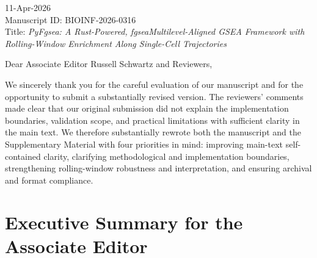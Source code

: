 \documentclass[11pt]{article}
\begin{document}
\begin{flushleft}
11-Apr-2026\\[0.75em]
Manuscript ID: BIOINF-2026-0316\\
Title: \textit{PyFgsea: A Rust-Powered, fgseaMultilevel-Aligned GSEA Framework with Rolling-Window Enrichment Along Single-Cell Trajectories}
\end{flushleft}

\vspace{0.5em}

Dear Associate Editor Russell Schwartz and Reviewers,

We sincerely thank you for the careful evaluation of our manuscript and for the opportunity to submit a substantially revised version. The reviewers' comments made clear that our original submission did not explain the implementation boundaries, validation scope, and practical limitations with sufficient clarity in the main text. We therefore substantially rewrote both the manuscript and the Supplementary Material with four priorities in mind: improving main-text self-contained clarity, clarifying methodological and implementation boundaries, strengthening rolling-window robustness and interpretation, and ensuring archival and format compliance.

\section*{Executive Summary for the Associate Editor}
\end{document}
